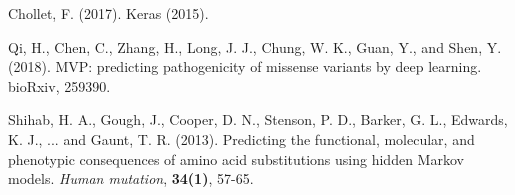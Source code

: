 \documentclass{bioinfo}
\begin{document}
\begin{thebibliography}{}
Chollet, F. (2017). Keras (2015).

Qi, H., Chen, C., Zhang, H., Long, J. J., Chung, W. K., Guan, Y., and Shen, Y. (2018). MVP: predicting pathogenicity of missense variants by deep learning. bioRxiv, 259390.

Shihab, H. A., Gough, J., Cooper, D. N., Stenson, P. D., Barker, G. L., Edwards, K. J., ... and Gaunt, T. R. (2013). Predicting the functional, molecular, and phenotypic consequences of amino acid substitutions using hidden Markov models. {\it Human mutation}, {\bf 34(1)}, 57-65.


\end{thebibliography}
\end{document}
